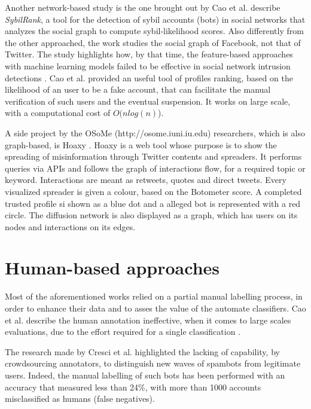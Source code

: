 Another network-based study is the one brought out by Cao et al. \cite{Sybils} describe \textit{SybilRank}, a tool for the detection of sybil accounts (bots) in social networks that analyzes the social graph to compute sybil-likelihood scores. Also differently from the other approached, the work studies the social graph of Facebook, not that of Twitter. The study highlights how, by that time, the feature-based approaches with machine learning models failed to be effective in social network intrusion detections \cite{Intrusion-Detection}. Cao et al. provided an useful tool of profiles ranking, based on the likelihood of an user to be a fake account, that can facilitate the manual verification of such users and the eventual suspension. It works on large scale, with a computational cost of $ O(n log(n) $).

A side project by the OSoMe (http://osome.iuni.iu.edu) researchers, which is also graph-based, is Hoaxy \cite{Misinformation, Hoaxy, Fact-Checking}.
Hoaxy is a web tool whose purpose is to show the spreading of misinformation through Twitter contents and spreaders. It performs queries via APIs and follows the graph of interactions flow, for a required topic or keyword. Interactions are meant as retweets, quotes and direct tweets. Every visualized spreader is given a colour, based on the Botometer score. A completed trusted profile si shown as a blue dot and a alleged bot is represented with a red circle. The diffusion network is also displayed as a graph, which has users on its nodes and interactions on its edges.


\section{Human-based approaches}

Most of the aforementioned works relied on a partial manual labelling process, in order to enhance their data and to asses the value of the automate classifiers. Cao et al. describe the human annotation ineffective, when it comes to large scales evaluations, due to the effort required for a single classification \cite{Sybils}.

The research made by Cresci et al. \cite{Cresci} highlighted the lacking of capability, by crowdsourcing annotators, to distinguish new waves of spambots from legitimate users. Indeed, the manual labelling of such bots has been performed with an accuracy that measured less than 24\%, with more than 1000 accounts misclassified as humans (false negatives).


